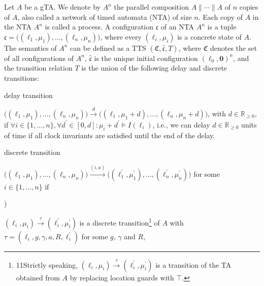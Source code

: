  
 
Let ${A}$ be a gTA. We denote by ${{A}}^{n}$ the parallel composition ${A}\parallel\cdots\parallel{A}$ of $n$ copies of ${A}$, also called a network of timed automata (NTA) of size $n$. Each copy of ${A}$ in the NTA ${{A}}^{n}$ is called a process. A configuration $\mathfrak{c}$ of an NTA ${{A}}^{n}$ is a tuple $\mathfrak{c}=\big((\mathrm{\ell}_{1},\mu_{1}),\ldots,(\mathrm{\ell}_{n},\mu_{n})\big)$, where every $(\mathrm{\ell}_{i},\mu_{i})$ is a concrete state of ${A}$. The semantics of ${{A}}^{n}$ can be defined as a TTS $(\mathfrak{C},\hat{\mathfrak{c}},T)$, where $\mathfrak{C}$ denotes the set of all configurations of ${{A}}^{n}$, $\hat{\mathfrak{c}}$ is the unique initial configuration $(\mathrm{\mathrm{\ell}_{0}},\mathbf{0})^{n}$, and the transition relation $T$ is the union of the following delay and discrete transitions:\par
  delay transition  
 
${\big((\mathrm{\ell}_{1},\mu_{1}),\ldots,(\mathrm{\ell}_{n},\mu_{n})\big)}\xrightarrow{d}{\big((\mathrm{\ell}_{1},\mu_{1}+d),\ldots,(\mathrm{\ell}_{n},\mu_{n}+d)\big)}$, with $d\in\mathbb{R}_{\geq 0}$, if $\forall i\in\{1,\dots,n\},\forall d^{\prime}\in[0,d]:\mu_{i}+d^{\prime}\models
I(\mathrm{\ell}_{i})$, i.e., we can delay $d\in\mathbb{R}_{\geq 0}$ units of time if all clock invariants are satisfied until the end of the delay.\par
 
  discrete transition  
 
${\big((\mathrm{\ell}_{1},\mu_{1}),\ldots,(\mathrm{\ell}_{n},\mu_{n})\big)}\xrightarrow{(i,a)}{\big((\mathrm{\ell}_{1}^{\prime},\mu_{1}^{\prime}),\ldots,(\mathrm{\ell}_{n}^{\prime},\mu_{n}^{\prime})\big)}$ for some $i\in\{1,\dots,n\}$ if\par
  
\par{}) 
 
${(\mathrm{\ell}_{i},\mu_{i})}\xrightarrow{\tau}{(\mathrm{\ell}_{i}^{\prime},\mu_{i}^{\prime})}$ is a discrete transition\footnote{11Strictly speaking, ${(\mathrm{\ell}_{i},\mu_{i})}\xrightarrow{\tau}{(\mathrm{\ell}_{i}^{\prime},\mu_{i}^{\prime})}$ is a transition of the TA obtained from ${A}$ by replacing location guards with $\top$. } of ${A}$ with $\tau=(\mathrm{\ell}_{i},g,\gamma,a,R,\mathrm{\ell}_{i}^{\prime})$ for some $g$, $\gamma$ and $R$,\par
 
